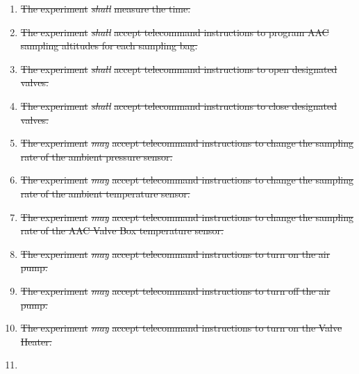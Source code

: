 \documentclass[a4paper,12pt,twoside]{article}
\providecommand{\DIFdeltex}[1]{{\protect\color{red}\sout{#1}}}                      %
\providecommand{\DIFdel}[1]{\texorpdfstring{\DIFdeltex{#1}}{}} %
\begin{document}
\begin{enumerate}
\item%
\DIFdel{The experiment }\textit{\DIFdel{shall}} %
\DIFdel{measure the time.
    }%
\item%
\DIFdel{The experiment }\textit{\DIFdel{shall}} %
\DIFdel{accept telecommand instructions to program AAC sampling altitudes for each sampling bag.
    }%
\item%
\DIFdel{The experiment }\textit{\DIFdel{shall}} %
\DIFdel{accept telecommand instructions to open designated valves.
    }%
\item%
\DIFdel{The experiment }\textit{\DIFdel{shall}} %
\DIFdel{accept telecommand instructions to close designated valves.
    }%
\item%
\DIFdel{The experiment }\textit{\DIFdel{may}} %
\DIFdel{accept telecommand instructions to change the sampling rate of the ambient pressure sensor.
    }%
\item%
\DIFdel{The experiment }\textit{\DIFdel{may}} %
\DIFdel{accept telecommand instructions to change the sampling rate of the ambient temperature sensor.
    }%
\item%
\DIFdel{The experiment }\textit{\DIFdel{may}} %
\DIFdel{accept telecommand instructions to change the sampling rate of the AAC Valve Box temperature sensor.
    }%
\item%
\DIFdel{The experiment }\textit{\DIFdel{may}} %
\DIFdel{accept telecommand instructions to turn on the air pump.
    }%
\item%
\DIFdel{The experiment }\textit{\DIFdel{may}} %
\DIFdel{accept telecommand instructions to turn off the air pump.
    }%
\item%
\DIFdel{The experiment }\textit{\DIFdel{may}} %
\DIFdel{accept telecommand instructions to turn on the Valve Heater.
    }%
\item%

\end{enumerate}
\end{document}
